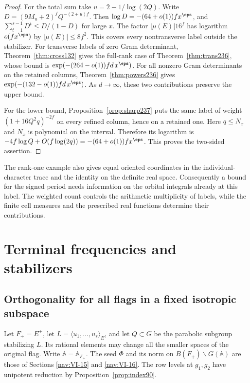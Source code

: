 \documentclass[a4paper,11pt]{article}
\theoremstyle{definition}
\theoremstyle{remark}
\numberwithin{equation}{section}
\begin{document}
\begin{proof}
For the total sum take \(u=2-1/\log(2Q)\). Write
\(D=(9M_u+2)^fQ^{-(2+u)f}\). Then
\(\log D=-(64+o(1))f x^\eps\), and
\(\sum_{t=1}^{s-1}D^t\le D/(1-D)\) for large \(x\).
The factor \(|\mu(E)|16^f\) has logarithm \(o(fx^\eps)\)
by \(|\mu(E)|\le8f^2\). This covers every nontransverse label
outside the stabilizer. For transverse labels of zero Gram
determinant, Theorem~\ref{thm:cross132} gives the full-rank
case of Theorem~\ref{thm:trans236}, whose bound is
\(\exp(-(264-o(1))fd\,x^\eps)\). For all nonzero Gram
determinants on the retained columns, Theorem~\ref{thm:powers236}
gives \(\exp(-(132-o(1))fd\,x^\eps)\). As \(d\to\infty\),
these two contributions preserve the upper bound.

For the lower bound, Proposition~\ref{prop:sharp237} puts
the same label of weight \((1+16Q^2q)^{-2f}\) on every
refined column, hence on a retained one. Here \(q\le N_x\)
and \(N_x\) is polynomial on the interval. Therefore its
logarithm is \(-4f\log Q+O(f\log(2q))=-(64+o(1))f x^\eps\).
This proves the two-sided assertion.
\end{proof}

The rank-one example also gives equal oriented coordinates
in the individual-character trace and the identity on the
definite real space. Consequently a bound for the signed
period needs information on the orbital integrals already at
this label. The weighted count controls the arithmetic
multiplicity of labels, while the finite cell measures and
the prescribed real functions determine their contributions.


\section{Terminal frequencies and stabilizers}\label{nav:g-XI-1}

\subsection{Orthogonality for all flags in a fixed isotropic subspace}\label{nav:VI-28}
Let \(F_+=E^+\), let \(L=\langle u_1,\ldots,u_s\rangle_E\), and let
\(Q\subset G\) be the parabolic subgroup stabilizing \(L\). Its
rational elements may change all the smaller spaces of the original
flag. Write \(\mathbb A=\mathbb A_{F_+}\). The seed \(\Phi\) and
its norm on \(B(F_+)\backslash G(\mathbb A)\) are those of
Sections \ref{nav:VI-15} and \ref{nav:VI-16}.
The row levels at \(g_1,g_2\) have unipotent reduction by
Proposition~\ref{prop:index90}.
\end{document}
